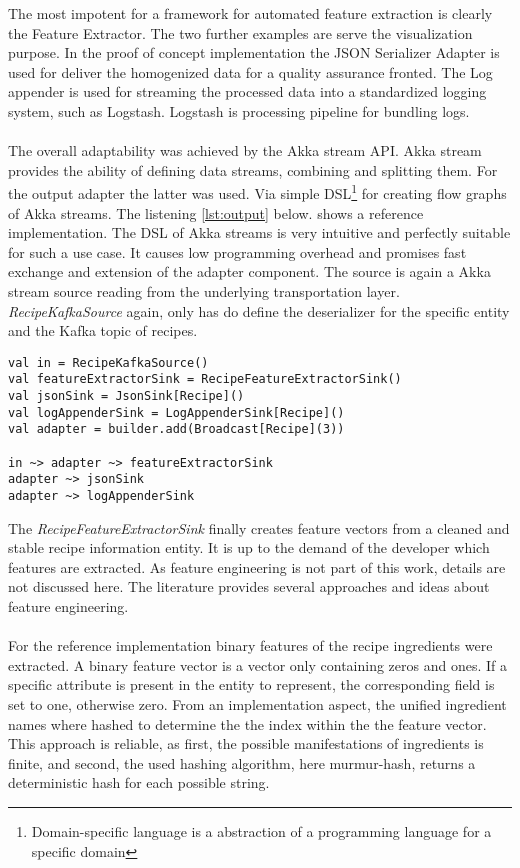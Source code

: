 The most impotent for a framework for automated feature extraction is clearly the Feature Extractor. The two further examples are serve the visualization purpose. In the proof of concept implementation the JSON Serializer Adapter is used for deliver the homogenized data for a quality assurance fronted. The Log appender is used for streaming the processed data into a standardized logging system, such as Logstash. Logstash is processing pipeline for bundling logs.
\\\\
The overall adaptability was achieved by the Akka stream API. Akka stream provides the ability of defining data streams, combining and splitting them. For the output adapter the latter was used. Via simple DSL\footnote{Domain-specific language is a abstraction of a programming language for a specific domain} for creating flow graphs of Akka streams. The listening \ref{lst:output} below. shows a reference implementation. The DSL of Akka streams is very intuitive and perfectly suitable for such a use case. It causes low programming overhead and promises fast exchange and extension of the adapter component. The source is again a Akka stream source reading from the underlying transportation layer. \textit{RecipeKafkaSource} again, only has do define the deserializer for the specific entity and the Kafka topic of recipes.

\begin{lstlisting}[style=myScalastyle,label={lst:output}]
val in = RecipeKafkaSource()
val featureExtractorSink = RecipeFeatureExtractorSink()
val jsonSink = JsonSink[Recipe]()
val logAppenderSink = LogAppenderSink[Recipe]()
val adapter = builder.add(Broadcast[Recipe](3))

in ~> adapter ~> featureExtractorSink
adapter ~> jsonSink
adapter ~> logAppenderSink
\end{lstlisting}

The \textit{RecipeFeatureExtractorSink} finally creates feature vectors from a cleaned and stable recipe information entity. It is up to the demand of the developer which features are extracted. As feature engineering is not part of this work, details are not discussed here. The literature provides several approaches and ideas about feature engineering. 
\\\\
For the reference implementation binary features of the recipe ingredients were extracted. A binary feature vector is a vector only containing zeros and ones. If a specific attribute is present in the entity to represent, the corresponding field is set to one, otherwise zero. From an implementation aspect, the unified ingredient names where hashed to determine the the index within the the feature vector. This approach is reliable, as first, the possible manifestations of ingredients is finite, and second, the used hashing algorithm, here murmur-hash, returns a deterministic hash for each possible string.

